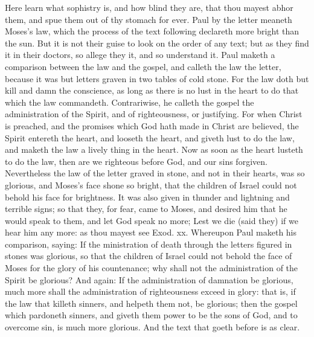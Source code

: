 Here learn what sophistry is, and how blind they are, 
that thou mayest abhor them, and spue them out of thy 
stomach for ever. Paul by the letter meaneth Moses's 
law, which the process of the text following declareth 
more bright than the sun. But it is not their guise to 
look on the order of any text; but as they find it in their 
doctors, so allege they it, and so understand it. Paul 
maketh a comparison between the law and the gospel, 
and calleth the law the letter, because it was but letters 
graven in two tables of cold stone. For the law doth but 
kill and damn the conscience, as long as there is no lust 
in the heart to do that which the law commandeth. Contrariwise,
he calleth the gospel the administration of the 
Spirit, and of righteousness, or justifying. For when 
Christ is preached, and the promises which God hath 
made in Christ are believed, the Spirit entereth the heart, 
and looseth the heart, and giveth lust to do the law, and 
maketh the law a lively thing in the heart. Now as soon 
as the heart lusteth to do the law, then are we righteous 
before God, and our sins forgiven. Nevertheless the law 
of the letter graved in stone, and not in their hearts, was 
so glorious, and Moses's face shone so bright, that the 
children of Israel could not behold his face for brightness. 
It was also given in thunder and lightning and terrible 
signs; so that they, for fear, came to Moses, and desired 
him that he would speak to them, and let God speak no 
more; Lest we die (said they) if we hear him any more: 
as thou mayest see Exod. xx. Whereupon Paul maketh 
his comparison, saying: If the ministration of death 
through the letters figured in stones was glorious, so that 
the children of Israel could not behold the face of Moses 
for the glory of his countenance; why shall not the administration
of the Spirit be glorious? And again: If 
the administration of damnation be glorious, much more 
shall the administration of righteousness exceed in glory: 
that is, if the law that killeth sinners, and helpeth them 
not, be glorious; then the gospel which pardoneth 
sinners, and giveth them power to be the sons of God, 
and to overcome sin, is much more glorious. And the 
text that goeth before is as clear. 


